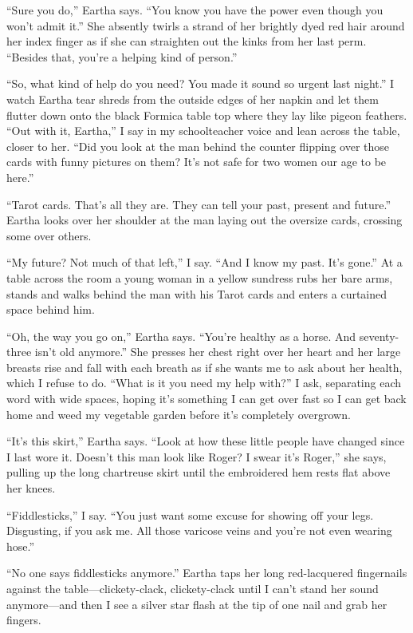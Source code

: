 \documentclass[twoside,10pt]{book}
\begin{document}
``Sure you do,'' Eartha says. ``You know you have the power even though
you won't admit it.'' She absently twirls a strand of her brightly dyed
red hair around her index finger as if she can straighten out the kinks
from her last perm. ``Besides that, you're a helping kind of person.''

``So, what kind of help do you need? You made it sound so urgent last
night.'' I watch Eartha tear shreds from the outside edges of her napkin
and let them flutter down onto the black Formica table top where they
lay like pigeon feathers. ``Out with it, Eartha,'' I say in my
schoolteacher voice and lean across the table, closer to her.
\clearpage
``Did you
look at the man behind the counter flipping over those cards with funny
pictures on them? It's not safe for two women our age to be here.''

``Tarot cards. That's all they are. They can tell your past, present and
future.'' Eartha looks over her shoulder at the man laying out the
oversize cards, crossing some over others.

``My future? Not much of that left,'' I say. ``And I know my past. It's
gone.'' At a table across the room a young woman in a yellow sundress
rubs her bare arms, stands and walks behind the man with his Tarot cards
and enters a curtained space behind him.

``Oh, the way you go on,'' Eartha says. ``You're healthy as a horse. And
seventy-three isn't old anymore.'' She presses her chest right over her
heart and her large breasts rise and fall with each breath as if she
wants me to ask about her health, which I refuse to do. ``What is it you
need my help with?'' I ask, separating each word with wide spaces,
hoping it's something I can get over fast so I can get back home and
weed my vegetable garden before it's completely overgrown.

``It's this skirt,'' Eartha says. ``Look at how these little people have
changed since I last wore it. Doesn't this man look like Roger? I swear
it's Roger,'' she says, pulling up the long chartreuse skirt until the
embroidered hem rests flat above her knees.

``Fiddlesticks,'' I say. ``You just want some excuse for showing off
your legs. Disgusting, if you ask me. All those varicose veins and
you're not even wearing hose.''

``No one says fiddlesticks anymore.'' Eartha taps her long red-lacquered
fingernails against the table---clickety-clack, clickety-clack until I
can't stand her sound anymore---and then I see a silver star flash at
the tip of one nail and grab her fingers.
\end{document}
